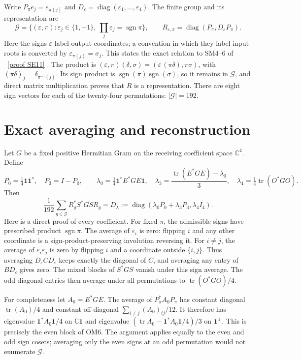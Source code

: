 \documentclass[11pt]{article}
\newcommand{\C}{\mathbb C}
\newcommand{\tr}{\operatorname{tr}}
\newcommand{\diag}{\operatorname{diag}}
\newcommand{\sgn}{\operatorname{sgn}}
\newcommand{\eps}{\varepsilon}
\newcommand{\one}{\mathbf 1}
\begin{document}
Write $P_\pi e_j=e_{\pi(j)}$ and $D_\eps=\diag(\eps_1,\ldots,\eps_4)$.
The finite group and its representation are
\[
\mathcal G=\{(\eps,\pi):\eps_j\in\{1,-1\},
       \ \prod_j\eps_j=\sgn\pi\},\qquad
R_{\eps,\pi}=\diag(P_\pi,D_\eps P_\pi).
\tag{OM4}
\]
Here the signs $\eps$ label output coordinates; a convention in which
they label input roots is converted by $\eps_{\pi(j)}=\sigma_j$.
This states the exact relation to SM4--6 of \cite{Fable}%
~\href{https://github.com/KokunoYumeto/zeta-function-research-reader/blob/5992ad50c0f2a06921f1fcaded7b4e38097c0739/workbenches/splitzero-tandem/continuations/20260920-original-kernel-mixed-determinants/providers/FABLE_TO_ORIGINAL_CONDUCTOR.tex\#L1967}{[proof SE11]}%
{}.
The product is
$(\eps,\pi)(\delta,\sigma)=(\eps\,(\pi\delta),\pi\sigma)$, with
$(\pi\delta)_j=\delta_{\pi^{-1}(j)}$.  Its sign product is
$\sgn(\pi)\sgn(\sigma)$, so it remains in $\mathcal G$, and direct
matrix multiplication proves that $R$ is a representation.  There
are eight sign vectors for each of the twenty-four permutations:
$|\mathcal G|=192$.

\section{Exact averaging and reconstruction}
Let $G$ be a fixed positive Hermitian Gram on the receiving coefficient
space $\C^4$.  Define
\[
P_0=\tfrac14\one\one^*,\quad P_3=I-P_0,\qquad
\lambda_0=\tfrac14\one^*E^*GE\one,\quad
\lambda_3=\frac{\tr(E^*GE)-\lambda_0}{3},\quad
\lambda_4=\tfrac14\tr(O^*GO).
\tag{OM5}
\]
Then
\[
\frac1{192}\sum_{g\in\mathcal G}R_g^*S^*GS R_g
=D_\lambda:=
\diag(\lambda_0P_0+\lambda_3P_3,\lambda_4I_4).
\tag{OM6}
\]
Here is a direct proof of every coefficient.  For fixed $\pi$, the
admissible signs have prescribed product $\sgn\pi$.  The average of
$\eps_i$ is zero: flipping $i$ and any other coordinate is a
sign-product-preserving involution reversing it.  For $i\ne j$,
the average of $\eps_i\eps_j$ is zero by flipping $i$ and a coordinate
outside $\{i,j\}$.  Thus averaging $D_\eps C D_\eps$ keeps exactly
the diagonal of $C$, and averaging any entry of $B D_\eps$ gives
zero.  The mixed blocks of $S^*GS$ vanish under this sign average.
The odd diagonal entries then average under all permutations to
$\tr(O^*GO)/4$.

For completeness let $A_0=E^*GE$.  The average of $P_\pi^*A_0P_\pi$
has constant diagonal $\tr(A_0)/4$ and constant off-diagonal
$\sum_{i\ne j}(A_0)_{ij}/12$.  It therefore has eigenvalue
$\one^*A_0\one/4$ on $\C\one$ and eigenvalue
$(\tr A_0-\one^*A_0\one/4)/3$ on $\one^\perp$.
This is precisely the even block of OM6.  The argument applies
equally to the even and odd sign cosets; averaging only the
even signs at an odd permutation would not enumerate $\mathcal G$.
\end{document}
